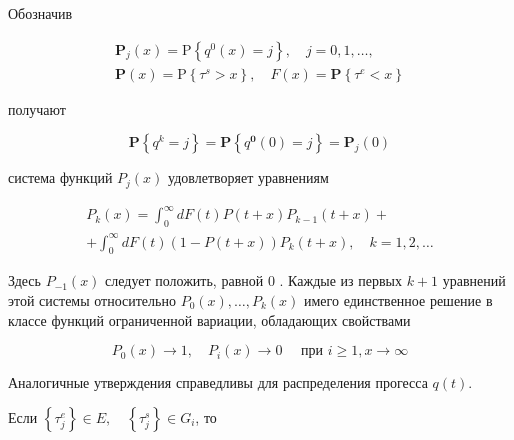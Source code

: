 \documentclass[10pt]{article}
\begin{document}
Обозначив



\[

\begin{gathered}

\boldsymbol{P}_{j}(x)=\mathrm{P}\left\{q^{0}(x)=j\right\}, \quad j=0,1, \ldots, \\

\boldsymbol{P}(x)=\mathrm{P}\left\{\tau^{s}>x\right\}, \quad F(x)=\mathbf{P}\left\{\tau^{e}<x\right\}

\end{gathered}

\]



получают



\[

\mathbf{P}\left\{q^{k}=j\right\}=\mathbf{P}\left\{q^{\mathbf{0}}(0)=j\right\}=\boldsymbol{P}_{j}(0)

\]



система функций $P_{j}(x)$ удовлетворяет уравнениям



\[

\begin{gathered}

P_{k}(x)=\int_{0}^{\infty} d F(t) P(t+x) P_{k-1}(t+x)+ \\

+\int_{0}^{\infty} d F(t)(1-P(t+x)) P_{k}(t+x), \quad k=1,2, \ldots

\end{gathered}

\]



Здесь $P_{-1}(x)$ следует положить, равной 0 . Каждые из первых $k+1$ уравнений этой системы относительно $P_{0}(x), \ldots, P_{k}(x)$ имего единственное решение в классе функций ограниченной вариации, обладающих свойствами



\[

P_{0}(x) \longrightarrow 1, \quad P_{i}(x) \longrightarrow 0 \quad \text { при } i \geqslant 1, x \longrightarrow \infty

\]



Аналогичные утверждения справедливы для распределения прогесса $q(t)$.



Если $\left\{\tau_{j}^{e}\right\} \in E, \quad\left\{\tau_{j}^{s}\right\} \in G_{i}$, то
\end{document}
